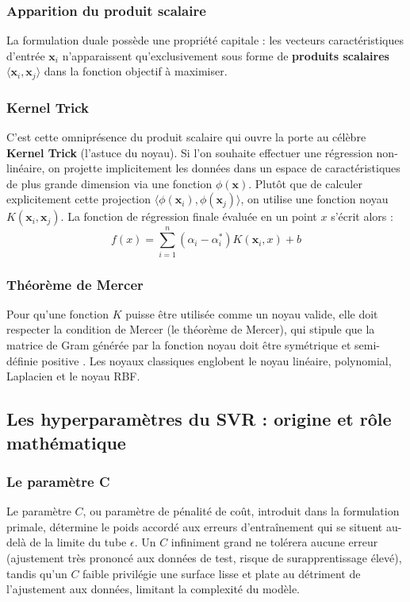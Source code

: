 \subsubsection{Apparition du produit scalaire}
La formulation duale possède une propriété capitale : les vecteurs caractéristiques d'entrée $\mathbf{x}_i$ n'apparaissent qu'exclusivement sous forme de \textbf{produits scalaires} $\langle \mathbf{x}_i, \mathbf{x}_j \rangle$ dans la fonction objectif à maximiser. 

\subsubsection{Kernel Trick}
C'est cette omniprésence du produit scalaire qui ouvre la porte au célèbre \textbf{Kernel Trick} (l'astuce du noyau). Si l'on souhaite effectuer une régression non-linéaire, on projette implicitement les données dans un espace de caractéristiques de plus grande dimension via une fonction $\phi(\mathbf{x})$. Plutôt que de calculer explicitement cette projection $\langle \phi(\mathbf{x}_i), \phi(\mathbf{x}_j) \rangle$, on utilise une fonction noyau $K(\mathbf{x}_i, \mathbf{x}_j)$. La fonction de régression finale évaluée en un point $x$ s'écrit alors :
\begin{equation}
f(x) = \sum_{i=1}^{n} (\alpha_i - \alpha_i^*) K(\mathbf{x}_i, x) + b
\end{equation}

\subsubsection{Théorème de Mercer}
Pour qu'une fonction $K$ puisse être utilisée comme un noyau valide, elle doit respecter la condition de Mercer (le théorème de Mercer), qui stipule que la matrice de Gram générée par la fonction noyau doit être symétrique et semi-définie positive \citep{scholkopf2002learning}. Les noyaux classiques englobent le noyau linéaire, polynomial, Laplacien et le noyau RBF.

\subsection{Les hyperparamètres du SVR : origine et rôle mathématique}

\subsubsection{Le paramètre C}
Le paramètre $C$, ou paramètre de pénalité de coût, introduit dans la formulation primale, détermine le poids accordé aux erreurs d'entraînement qui se situent au-delà de la limite du tube $\epsilon$. Un $C$ infiniment grand ne tolérera aucune erreur (ajustement très prononcé aux données de test, risque de surapprentissage élevé), tandis qu'un $C$ faible privilégie une surface lisse et plate au détriment de l'ajustement aux données, limitant la complexité du modèle.


